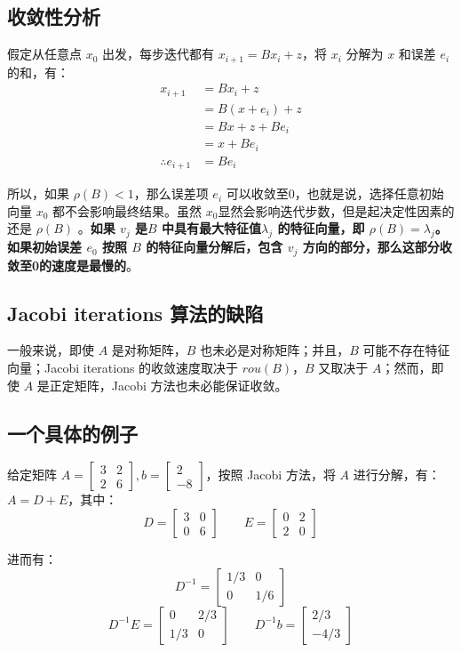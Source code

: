 \documentclass[12pt]{article}
\begin{document}
\subsection{收敛性分析}
假定从任意点 $x_0$ 出发，每步迭代都有 $x_{i+1} = Bx_i + z$，将 $x_i$ 分解为 $x$ 和误差 $e_i$ 的和，有：
\begin{align*}
x_{i+1} &= Bx_i + z \\
 	   &= B(x + e_i) + z \\
	   &= Bx + z + Be_i \\
	   &= x + Be_i \\
\therefore e_{i+1} &= Be_i
\end{align*}

所以，如果 $\rho(B) < 1$，那么误差项 $e_i$ 可以收敛至0，也就是说，选择任意初始向量 $x_0$ 都不会影响最终结果。虽然 $x_0$显然会影响迭代步数，但是起决定性因素的还是 $\rho(B)$ 。\textbf{如果 $v_j$ 是$B$ 中具有最大特征值$\lambda_j$ 的特征向量，即 $\rho(B) = \lambda_j$。如果初始误差 $e_0$ 按照 $B$ 的特征向量分解后，包含 $v_j$ 方向的部分，那么这部分收敛至0的速度是最慢的}。

\subsection{Jacobi iterations 算法的缺陷}
一般来说，即使 $A$ 是对称矩阵，$B$ 也未必是对称矩阵；并且，$B$ 可能不存在特征向量；Jacobi iterations 的收敛速度取决于 $rou(B)$，$B$ 又取决于 $A$；然而，即使 $A$ 是正定矩阵，Jacobi 方法也未必能保证收敛。


\subsection{一个具体的例子}
给定矩阵 $A = \begin{bmatrix} 3 & 2 \\ 2 & 6 \end{bmatrix}, b = \begin{bmatrix} 2 \\ -8 \end{bmatrix}$，按照 Jacobi 方法，将 $A$ 进行分解，有：$A = D + E$，其中：
$$
D = \begin{bmatrix} 3 & 0 \\ 0 & 6\end{bmatrix} \qquad E = \begin{bmatrix} 0 & 2 \\ 2 & 0\end{bmatrix}
$$

进而有：
$$
D^{-1} = \begin{bmatrix} 1/3 & 0 \\ 0 & 1/6\end{bmatrix} 
$$
$$
D^{-1} E = \begin{bmatrix} 0 & 2/3 \\ 1/3 & 0\end{bmatrix} \qquad D^{-1} b = \begin{bmatrix} 2/3 \\ -4/3\end{bmatrix} 
$$
\end{document}
